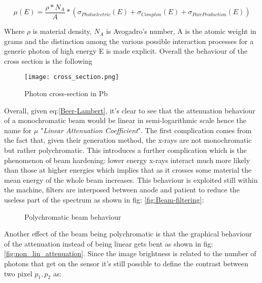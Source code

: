 \begin{equation}\label{Lin_att_coef_def}
\mu(E) = \frac{\rho*N_A}{A}*(\sigma_{Photoelectric}(E)+\sigma_{Compton}(E)+\sigma_{PairProduction}(E))
\end{equation}

Where $\rho$ is material density, $N_A$ is Avogadro's number, A is the atomic weight in grams and the distinction among the various possible interaction processes for a generic photon of high energy E is made explicit. Overall the behaviour of the cross section is the following

\begin{figure}[H]
\centering
  		\texttt{[image: cross\_section.png]}
        \caption{Photon cross-section in Pb\label{fig:Photon-Cross-sect}}
\end{figure}

Overall, given eq:\ref{Beer-Lambert}, it's clear to see that the attenuation behaviour of a monochromatic beam would be linear in semi-logarithmic scale hence the name for $\mu$ "\textit{Linear Attenuation Coefficient}". The first complication comes from the fact that, given their generation method, the x-rays are not monochromatic but rather polychromatic. This introduces a further complication which is the phenomenon of beam hardening: lower energy x-rays interact much more likely than those at higher energies which implies that as it crosses some material the mean energy of the whole beam increases. This behaviour is exploited still within the machine, filters are interposed between anode and patient to reduce the useless part of the spectrum as shown in fig: \ref{fig:Beam-filtering}:

\begin{figure}[H]
\centering
        \caption{Polychromatic beam behaviour}\label{fig:polychrom_behaviour}
\end{figure}

Another effect of the beam being polychromatic is that the graphical behaviour of the attenuation instead of being linear gets bent as shown in fig: \ref{fig:non_lin_attenuation}. Since the image brightness is related to the number of photons that get on the sensor it's still possible to define the contrast between two pixel $p_1, p_2$ as:

